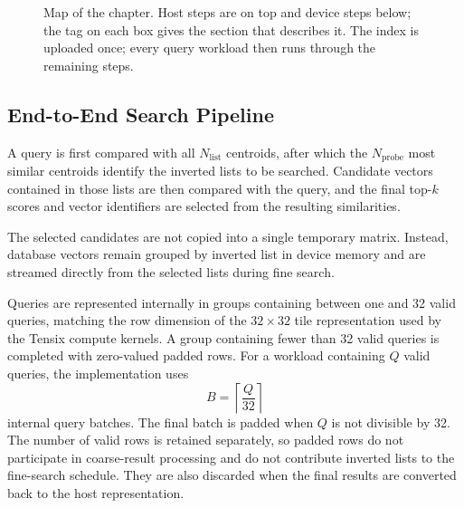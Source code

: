 \begin{figure}[htbp]
{}
\caption{Map of the chapter. Host steps are on top and device steps below; the
tag on each box gives the section that describes it. The index is uploaded
once; every query workload then runs through the remaining steps.}
\label{fig:design-map}
\end{figure}

\subsection{End-to-End Search Pipeline}
\label{subsec:end-to-end-pipeline}

A query is first compared with all \(N_{\mathrm{list}}\) centroids, after which the \(N_{\mathrm{probe}}\) most similar centroids identify the inverted lists to be searched. Candidate vectors contained in those lists are then compared with the query, and the final top-\(k\) scores and vector identifiers are selected from the resulting similarities.


The selected candidates are not copied into a single temporary matrix. Instead, database vectors remain grouped by inverted list in device memory and are streamed directly from the selected lists during fine search.

Queries are represented internally in groups containing between one and 32 valid queries, matching the row dimension of the \(32\times32\) tile representation used by the Tensix compute kernels. A group containing fewer than 32 valid queries is completed with zero-valued padded rows. For a workload containing \(Q\) valid queries, the implementation uses
\begin{equation}
B=\left\lceil\frac{Q}{32}\right\rceil
\end{equation}
internal query batches. The final batch is padded when \(Q\) is not divisible by 32. The number of valid rows is retained separately, so padded rows do not participate in coarse-result processing and do not contribute inverted lists to the fine-search schedule. They are also discarded when the final results are converted back to the host representation.

